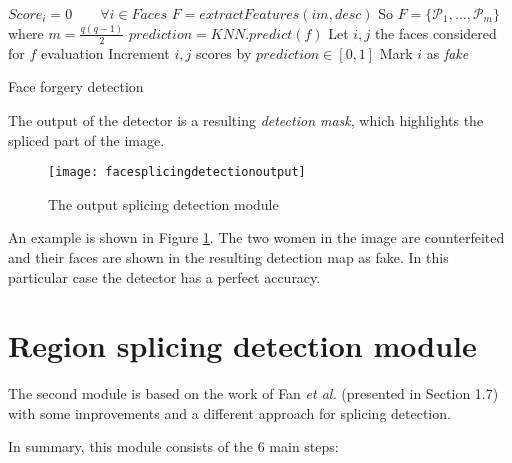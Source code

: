 \begin{algorithm}[!h]
\begin{algorithmic}[1]
\State $Score_i = 0 \qquad \forall i \in Faces$ 
\State $F = extractFeatures(im, desc)$
\State So $F = \{\mathcal{P}_1, \ldots, \mathcal{P}_m\} $ where $ m = \frac{q(q-1)}{2}$
\State $prediction = KNN.predict(f)$
\State Let $i, j$ the faces considered for $f$ evaluation
\State Increment $i, j$ scores by $prediction \in [0, 1]$
\EndIf
\EndFor
\EndFor
\EndFor
{}
\State Mark $i$ as \emph{fake}
\EndIf
\EndFor
\end{algorithmic}\caption{Face forgery detection}\label{alg:faceforgerydetection}
\end{algorithm}

The output of the detector is a resulting \emph{detection mask}, which highlights the spliced part of the image.

\begin{figure}[h!]
  \centering
    \texttt{[image: facesplicingdetectionoutput]}
    \caption{The output splicing detection module}
    \label{fig:facesplicingdetectionoutput}
\end{figure}

An example is shown in Figure \ref{fig:facesplicingdetectionoutput}. The two women in the image are counterfeited and their faces are shown in the resulting detection map as fake. In this particular case the detector has a perfect accuracy. 

\section{Region splicing detection module}

The second module is based on the work of Fan \emph{et al.}\cite{fan2015image} (presented in Section 1.7) with some improvements and a different approach for splicing detection.

In summary, this module consists of the 6 main steps:

